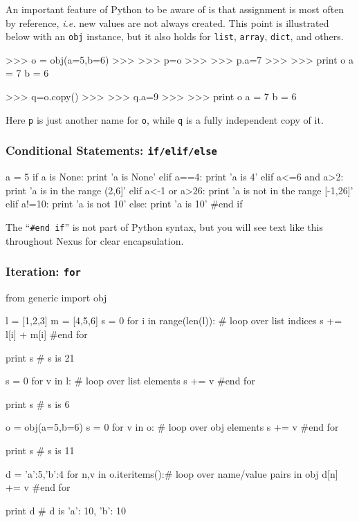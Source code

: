 An important feature of Python to be aware of is that assignment is most often by reference, \emph{i.e.} new values are not always created.  This point is illustrated below with an \texttt{obj} instance, but it also holds for \texttt{list}, \texttt{array}, \texttt{dict}, and others.
\begin{shade}
>>> o = obj(a=5,b=6)
>>> 
>>> p=o
>>> 
>>> p.a=7
>>> 
>>> print o
  a               = 7
  b               = 6

>>> q=o.copy()
>>> 
>>> q.a=9
>>> 
>>> print o
  a               = 7
  b               = 6
\end{shade}
\noindent
Here \texttt{p} is just another name for \texttt{o}, while \texttt{q} is a fully independent copy of it.


\subsubsection{Conditional Statements: \texttt{if/elif/else}}
\begin{shade}
a = 5
if a is None:
    print 'a is None'
elif a==4:
    print 'a is 4'
elif a<=6 and a>2:
    print 'a is in the range (2,6]'
elif a<-1 or a>26:
    print 'a is not in the range [-1,26]'
elif a!=10: 
    print 'a is not 10'
else:
    print 'a is 10'
#end if

\end{shade}
The ``\texttt{\#end if}'' is not part of Python syntax, but you will see text like this throughout Nexus for clear encapsulation.

\subsubsection{Iteration: \texttt{for}}
\begin{shade}
from generic import obj

l = [1,2,3]              
m = [4,5,6]
s = 0
for i in range(len(l)):  # loop over list indices
    s += l[i] + m[i]
#end for

print s                  # s is 21

s = 0                    
for v in l:              # loop over list elements
    s += v
#end for

print s                  # s is 6

o = obj(a=5,b=6)
s = 0
for v in o:              # loop over obj elements
    s += v
#end for

print s                  # s is 11

d = {'a':5,'b':4}
for n,v in o.iteritems():# loop over name/value pairs in obj
    d[n] += v
#end for

print d                  # d is {'a': 10, 'b': 10}

\end{shade}


